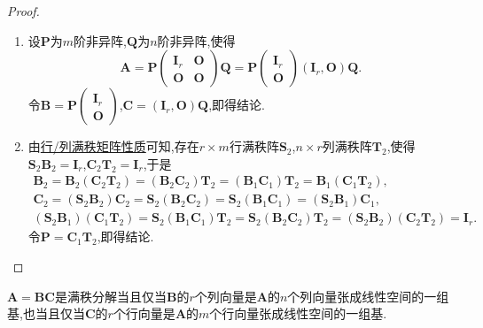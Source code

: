 \documentclass[../../main.tex]{subfiles}
\begin{document}
\begin{proof}
\begin{enumerate}[(1)]
\item 设\(\boldsymbol{P}\)为\(m\)阶非异阵,\(\boldsymbol{Q}\)为\(n\)阶非异阵,使得
\[
\boldsymbol{A}=\boldsymbol{P}\begin{pmatrix}
\boldsymbol{I}_r&\boldsymbol{O}\\
\boldsymbol{O}&\boldsymbol{O}
\end{pmatrix}\boldsymbol{Q}=\boldsymbol{P}\begin{pmatrix}
\boldsymbol{I}_r\\
\boldsymbol{O}
\end{pmatrix}(\boldsymbol{I}_r,\boldsymbol{O})\boldsymbol{Q}.
\]
令\(\boldsymbol{B}=\boldsymbol{P}\begin{pmatrix}
\boldsymbol{I}_r\\
\boldsymbol{O}
\end{pmatrix}\),\(\boldsymbol{C}=(\boldsymbol{I}_r,\boldsymbol{O})\boldsymbol{Q}\),即得结论.

\item  由\hyperref[proposition:行/列满秩矩阵性质]{行/列满秩矩阵性质}可知,存在\(r\times m\)行满秩阵\(\boldsymbol{S}_2\),\(n\times r\)列满秩阵\(\boldsymbol{T}_2\),使得\(\boldsymbol{S}_2\boldsymbol{B}_2=\boldsymbol{I}_r\),\(\boldsymbol{C}_2\boldsymbol{T}_2=\boldsymbol{I}_r\),于是
\begin{gather*}
\boldsymbol{B}_2=\boldsymbol{B}_2(\boldsymbol{C}_2\boldsymbol{T}_2)=(\boldsymbol{B}_2\boldsymbol{C}_2)\boldsymbol{T}_2=(\boldsymbol{B}_1\boldsymbol{C}_1)\boldsymbol{T}_2=\boldsymbol{B}_1(\boldsymbol{C}_1\boldsymbol{T}_2),\\
\boldsymbol{C}_2=(\boldsymbol{S}_2\boldsymbol{B}_2)\boldsymbol{C}_2=\boldsymbol{S}_2(\boldsymbol{B}_2\boldsymbol{C}_2)=\boldsymbol{S}_2(\boldsymbol{B}_1\boldsymbol{C}_1)=(\boldsymbol{S}_2\boldsymbol{B}_1)\boldsymbol{C}_1,\\
(\boldsymbol{S}_2\boldsymbol{B}_1)(\boldsymbol{C}_1\boldsymbol{T}_2)=\boldsymbol{S}_2(\boldsymbol{B}_1\boldsymbol{C}_1)\boldsymbol{T}_2=\boldsymbol{S}_2(\boldsymbol{B}_2\boldsymbol{C}_2)\boldsymbol{T}_2=(\boldsymbol{S}_2\boldsymbol{B}_2)(\boldsymbol{C}_2\boldsymbol{T}_2)=\boldsymbol{I}_r.
\end{gather*}
令\(\boldsymbol{P}=\boldsymbol{C}_1\boldsymbol{T}_2\),即得结论.
\end{enumerate}

\end{proof}

\begin{proposition}\label{proposition:几何观点下的矩阵满秩分解}
\(\boldsymbol{A}=\boldsymbol{B}\boldsymbol{C}\)是满秩分解当且仅当\(\boldsymbol{B}\)的\(r\)个列向量是\(\boldsymbol{A}\)的\(n\)个列向量张成线性空间的一组基,也当且仅当\(\boldsymbol{C}\)的\(r\)个行向量是\(\boldsymbol{A}\)的\(m\)个行向量张成线性空间的一组基.
\end{proposition}
\end{document}
